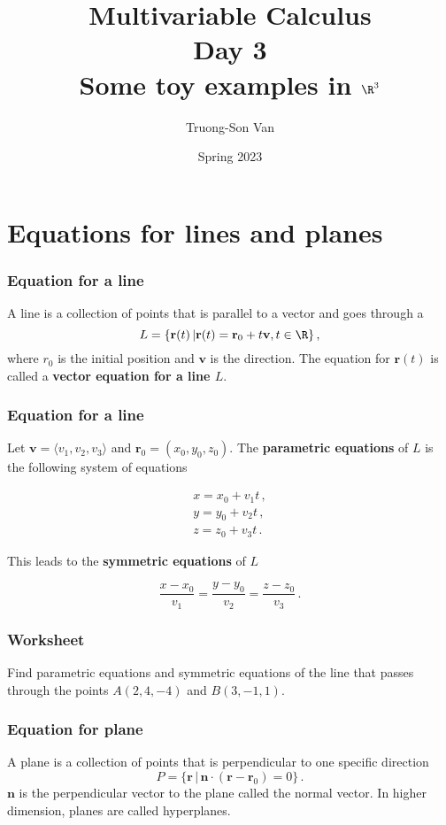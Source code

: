 \documentclass[aspectratio=169]{beamer}
\title{ Multivariable Calculus \\ Day 3 \\ Some toy examples in $\R^3$}
\institute{Fulbright University Vietnam}
\author{Truong-Son Van}
\date{Spring 2023}
\newcommand{\vect}{\mathbf}
\begin{document}
\maketitle

\section{Equations for lines and planes}

\begin{frame}
    \frametitle{Equation for a line}
A line is a collection of points that is parallel to a vector and goes through a 
\begin{equation*}
    L = \{\vect{r}(t) \,|  \vect{r}(t) = \vect{r}_0 + t \vect{v}, t\in \R \}  \,,
\end{equation*}
where ${r}_0$ is the initial position and $\vect{v}$ is the direction.
The equation for $\vect{r}(t)$ is called a \textbf{vector equation for a line $L$}.
\end{frame}

\begin{frame}
    \frametitle{Equation for a line}
Let $\vect{v} = \langle v_1, v_2, v_3 \rangle$ and $\vect{r}_0 = ( x_0, y_0, z_0 )$.
The \textbf{parametric equations} of $L$ is the following system of equations

\begin{gather*}
    x = x_0 + v_1 t\,, \\
    y = y_0 + v_2 t\,, \\
    z = z_0 + v_3 t \,. 
\end{gather*}

This leads to the \textbf{symmetric equations} of $L$

\begin{equation*}
    \frac{x - x_0}{v_1} = \frac{y - y_0}{v_2} = \frac{z - z_0}{v_3} \,.
\end{equation*}
\end{frame}

\begin{frame}
    \frametitle{Worksheet}
    Find parametric equations and symmetric equations of the line that passes 
    through the points $A(2,4,-4)$ and $B(3,-1,1)$.
\end{frame}


\begin{frame}
    \frametitle{Equation for plane}
A plane is a collection of points that is perpendicular to one specific direction 
\begin{equation*}
    P = \{ \vect{r} \, | \, \vect{n} \cdot (\vect{r}- \vect{r}_0 ) = 0 \} \,.
\end{equation*}
$\vect{n}$ is the perpendicular vector to the plane called the normal vector.
In higher dimension, planes are called hyperplanes.
\end{frame}
\end{document}
